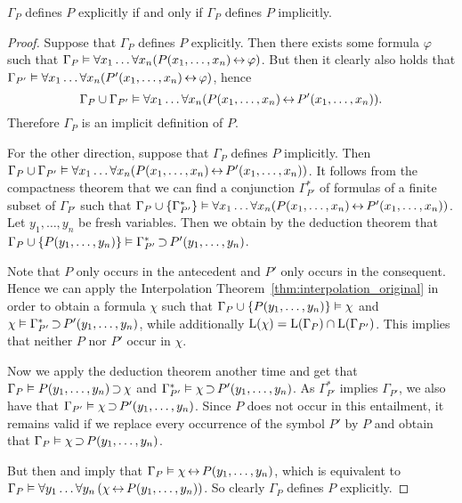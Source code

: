 \begin{thm}
	$\Gamma_P$ defines $P$ explicitly if and only if $\Gamma_P$ defines $P$ implicitly.
\end{thm}
\begin{proof}
	Suppose that $\Gamma_P$ defines $P$ explicitly. 
	Then there exists some formula $\varphi$ such that 
	$\Gamma_P\vDash \forall x_1\dots \forall x_n (  P(x_1, \dots, x_n) \operatorname{\leftrightarrow} \varphi)$.
	But then it clearly also holds that 
	$\Gamma_{P'}\vDash \forall x_1\dots \forall x_n (  P'(x_1, \dots, x_n) \operatorname{\leftrightarrow} \varphi)$,
	hence
	\[
	\Gamma_{P} \cup \Gamma_{P'} \vDash \forall x_1\dots \forall x_n (P(x_1, \dots, x_n) \operatorname{\leftrightarrow} P'(x_1, \dots, x_n)).\]
	Therefore $\Gamma_P$ is an implicit definition of $P$.

	For the other direction, suppose that $\Gamma_P$ defines $P$ implicitly. 
	Then
	$\Gamma_P \cup \Gamma_{P'} \vDash\allowbreak \forall x_1\dots \forall x_n (  P(x_1, \dots, x_n) \operatorname{\leftrightarrow} P'(x_1, \dots, x_n))$.
	It follows from the compactness theorem that
	we can find a conjunction $\Gamma^*_{P'}$ of formulas of a finite subset of $\Gamma_{P'}$ such that  
	$\Gamma_P \cup \{\Gamma^*_{P'}\} \vDash \forall x_1\dots \forall x_n (  P(x_1, \dots, x_n) \operatorname{\leftrightarrow} P'(x_1, \dots, x_n))$.
	Let $y_1, \dots, y_n$ be fresh variables.
	Then we obtain by the deduction theorem that  
	$\Gamma_P \cup \{P(y_1, \dots, y_n)\} \vDash \Gamma^*_{P'} \operatorname{\supset}  P'(y_1, \dots, y_n)$.

	Note that $P$ only occurs in the antecedent and $P'$ only occurs in the consequent.
	Hence we can apply the Interpolation Theorem~\ref{thm:interpolation_original} in order to obtain a formula $\chi$
	such that
	$\Gamma_P \cup \{P(y_1, \dots, y_n)\} \vDash \chi$ and
	$\chi \vDash \Gamma^*_{P'} \operatorname{\supset}  P'(y_1, \dots, y_n)$,
	while additionally $\operatorname{L}(\chi) = \operatorname{L}(\Gamma_P) \cap \operatorname{L}(\Gamma_{P'})$. This implies that neither $P$ nor $P'$ occur in\nolinebreak{} $\chi$.

	Now we apply the deduction theorem another time and get that
	\markA{} $\Gamma_P \vDash P(y_1, \dots, y_n) \operatorname{\supset} \chi$ and
	$\Gamma^*_{P'} \vDash \chi \operatorname{\supset}  P'(y_1, \dots, y_n)$.
	As $\Gamma^*_{P'}$ implies $\Gamma_{P'}$, we also have that
	$\Gamma_{P'} \vDash \chi \operatorname{\supset}  P'(y_1, \dots, y_n)$.
	Since $P$ does not occur in this entailment, it remains valid if we replace every occurrence of the symbol $P'$ by $P$
	and obtain that
	\markB{} $\Gamma_{P} \vDash \chi \operatorname{\supset}  P(y_1, \dots, y_n)$.

	But then \markA{} and \markB{} imply that 
	$\Gamma_{P} \vDash \chi \operatorname{\leftrightarrow}  P(y_1, \dots, y_n)$, which is equivalent to
	$\Gamma_{P} \vDash \forall y_1\dots\forall y_n \left( \chi \operatorname{\leftrightarrow}  P(y_1, \dots, y_n)\right)$.
	So clearly $\Gamma_P$ defines $P$ explicitly.
\end{proof}

